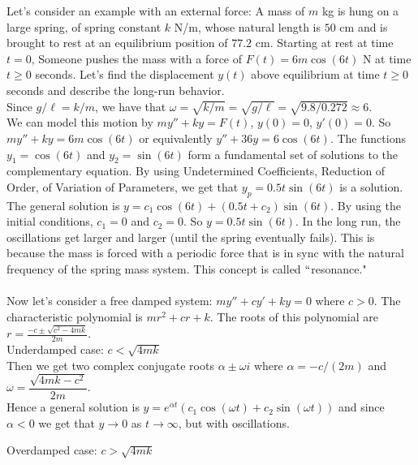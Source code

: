 \documentclass{ximera}
\begin{document}
 Let's consider an example with an external force: A mass of $m$ kg is hung on a large spring, of spring constant $k$ N/m, whose natural length is $50$ cm and is brought to rest at an equilibrium position of $77.2$ cm.  Starting at rest at time $t=0$, Someone pushes the mass with a force of  $F(t)=6m\cos{(6t)}$ N at time $t\geq 0$ seconds.  Let's find the displacement $y(t)$ above equilibrium at time $t\geq 0$ seconds and describe the long-run behavior.\\


 Since $g/\ell=k/m$, we have that $\omega=\sqrt{k/m}=\sqrt{g/\ell}=\sqrt{9.8/0.272}\approx 6$.\\

 We can model this motion by $my''+ky=F(t)$, $y(0)=0$, $y'(0)=0$.  So $my''+ky=6m \cos{(6t)}$ or equivalently $y''+36 y= 6\cos{(6t)}$.  The functions $y_1=\cos{(6t)}$ and $y_2=\sin{(6t)}$ form a fundamental set of solutions to the complementary equation.   By using Undetermined Coefficients, Reduction of Order, of Variation of Parameters, we get that $y_p=0.5t\sin{(6t)}$ is a solution.  The general solution is $y=c_1 \cos{(6t)}+(0.5t +c_2)\sin{(6t)}$.  By using the initial conditions, $c_1=0$ and $c_2=0$.  So $y=0.5t \sin{(6t)}$.  In the long run, the oscillations get larger and larger (until the spring eventually fails).  This is because the mass is forced with a periodic force that is in sync with the natural frequency of the spring mass system.  This concept is called $``$resonance."\\ \\

 Now let's consider a free damped system:  $my''+cy'+ky=0$ where $c>0$.  The characteristic polynomial is $mr^{2}+cr+k$.   The roots of this polynomial are $\displaystyle r=\frac{-c\pm \sqrt{c^{2}-4mk}}{2m}$.\\


 Underdamped case: $c<\sqrt{4mk}$\\

 Then we get two complex conjugate roots $\alpha\pm \omega i$ where $\alpha=-c/(2m)$ and $\omega=\dfrac{\sqrt{4mk-c^{2}}}{2m}$.\\

 Hence a general solution is $y=e^{\alpha t}(c_{1}\cos{(\omega t)}+c_{2}\sin{(\omega t)})$ and since $\alpha<0$ we get that $y\rightarrow 0$ as $t\rightarrow \infty$, but with oscillations.\\

\newpage

 Overdamped case: $c>\sqrt{4mk}$\\
\end{document}
